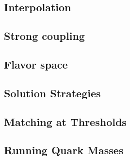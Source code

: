 \subsection{Interpolation}
\label{sec:eko/theory-interpolation}


\subsection{Strong coupling}
\label{sec:eko/theory-coupling}


\subsection{Flavor space}
\label{sec:eko/theory-flavor}


\subsection{Solution Strategies}
\label{sec:eko/theory-solutions}


\subsection{Matching at Thresholds}
\label{sec:eko/theory-matching}


\subsection{Running Quark Masses}
\label{sec:eko/theory-msbarmass}


